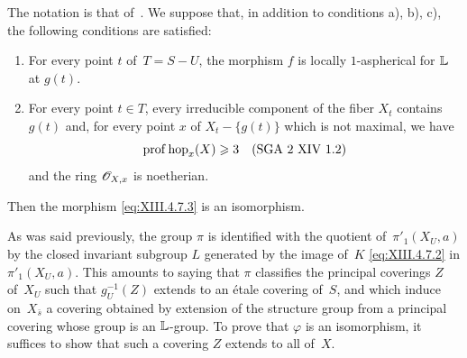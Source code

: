 \begin{subproposition}
\label{XIII.4.7.4} The notation is that of~. We
suppose that, in addition to conditions \textup{a), b), c)}, the following
conditions are satisfied:
\begin{enumerate}
\item[d)] For every point $t$ of~$T=S-U$, the morphism $f$ is
locally $1$-aspherical for $\mathbb{L}$ at $g(t)$.
\item[e)] For every point $t\in T$, every irreducible component
of the fiber $X_t$ contains $g(t)$ and, for every point $x$ of
$X_t-\{g(t)\}$ which is not maximal, we have
$$
\operatorname{prof}\operatorname{hop}_x(X)\geqslant 3 \quad\textup{(SGA~2 XIV~1.2)}
$$
and the ring $\cal{O}_{X,x}$ is noetherian.
\end{enumerate}

Then the morphism \eqref{eq:XIII.4.7.3} is an isomorphism.
\end{subproposition}

As was said previously, the group $\pi$ is identified with the
quotient of~$\pi'_1(X_U,a)$ by the closed invariant subgroup $L$
generated by the image of~$K$ \eqref{eq:XIII.4.7.2} in
$\pi'_1(X_U,a)$. This amounts to saying that $\pi$ classifies the
principal coverings $Z$ of~$X_U$ such that $g^{-1}_U(Z)$
extends to an \'etale covering of~$S$, and which induce on~$X_{\bar{s}}$ a covering obtained by extension of the structure
group from a principal covering whose group is an
$\mathbb{L}$-group. To prove that $\varphi$ is an isomorphism, it
suffices to show that such a covering $Z$ extends to all
of~$X$.

